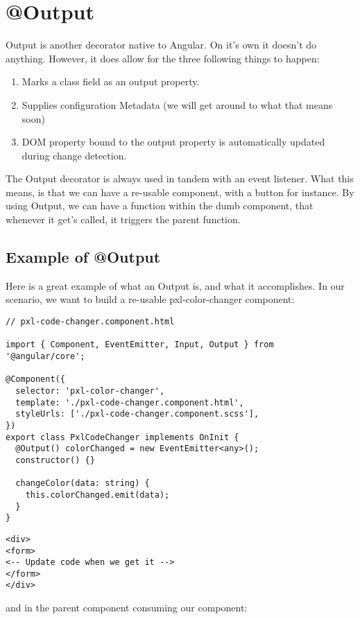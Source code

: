 
\chapter{ @Output }

Output is another decorator native to Angular. On it's own it doesn't do
anything. However, it does allow for the three following things to happen:
\begin{enumerate}
  \item Marks a class field as an output property.
  \item Supplies configuration Metadata (we will get around to what that means
  soon)
  \item DOM property bound to the output property is automatically updated
  during change detection.
\end{enumerate}

The Output decorator is always used in tandem with an event listener. What this
means, is that we can have a re-usable component, with a button for instance.
By using Output, we can have a function within the dumb component, that whenever
it get's called, it triggers the parent function.

\section{ Example of @Output }

Here is a great example of what an Output is, and what it accomplishes. In
our scenario, we want to build a re-usable pxl-color-changer component:
\begin{lstlisting}
// pxl-code-changer.component.html

import { Component, EventEmitter, Input, Output } from '@angular/core';

@Component({
  selector: 'pxl-color-changer',
  template: './pxl-code-changer.component.html',
  styleUrls: ['./pxl-code-changer.component.scss'],
})
export class PxlCodeChanger implements OnInit {
  @Output() colorChanged = new EventEmitter<any>();
  constructor() {}

  changeColor(data: string) {
    this.colorChanged.emit(data);
  }
}
\end{lstlisting}

\begin{lstlisting}
<div>
<form>
<-- Update code when we get it -->
</form>
</div>
\end{lstlisting}

and in the parent component consuming our component:

